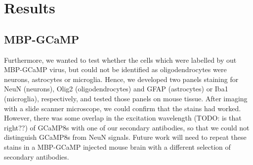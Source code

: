 \chapter{\label{ch:3-results}Results}

\minitoc

\section{MBP-GCaMP}
Furthermore, we wanted to test whether the cells which were labelled by out MBP-GCaMP virus, but could not be identified as oligodendrocytes were neurons, astrocytes or microglia.
Hence, we developed two panels staining for NeuN (neurons), Olig2 (oligodendrocytes) and GFAP (astrocytes) or Iba1 (microglia), respectively, and tested those panels on mouse tissue. After imaging with a slide scanner microscope, we could confirm that the stains had worked.
However, there was some overlap in the excitation wavelength (TODO: is that right??) of GCaMP8s with one of our secondary antibodies, so that we could not distinguish GCaMP8s from NeuN signals.
Future work will need to repeat these stains in a MBP-GCaMP injected mouse brain with a different selection of secondary antibodies.
